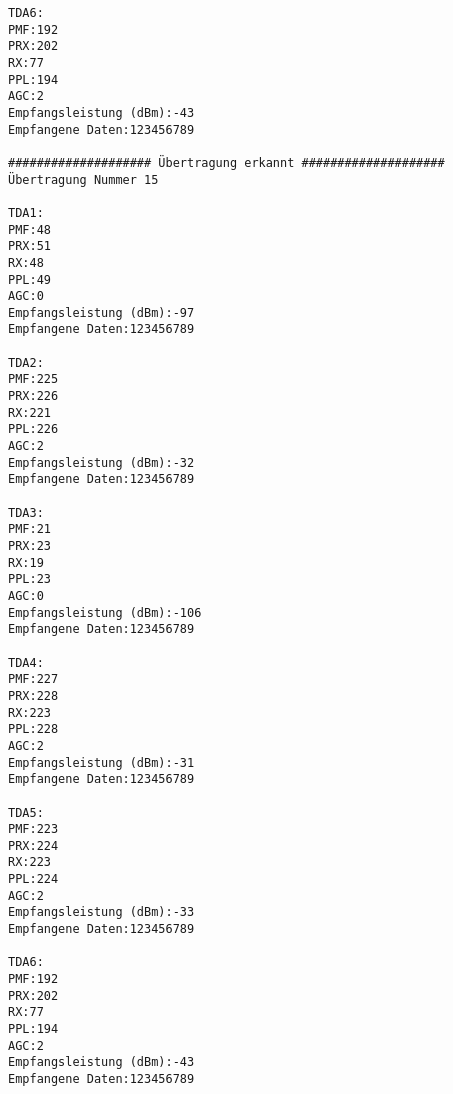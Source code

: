 \begin{lstlisting}[nolol=true,caption={Ausgabe des ersten Feldtests in der Konsole},label={listing:Feldtest1},captionpos=t]
TDA6:
PMF:192
PRX:202
RX:77
PPL:194
AGC:2
Empfangsleistung (dBm):-43
Empfangene Daten:123456789

#################### Übertragung erkannt ####################
Übertragung Nummer 15

TDA1:
PMF:48
PRX:51
RX:48
PPL:49
AGC:0
Empfangsleistung (dBm):-97
Empfangene Daten:123456789

TDA2:
PMF:225
PRX:226
RX:221
PPL:226
AGC:2
Empfangsleistung (dBm):-32
Empfangene Daten:123456789

TDA3:
PMF:21
PRX:23
RX:19
PPL:23
AGC:0
Empfangsleistung (dBm):-106
Empfangene Daten:123456789

TDA4:
PMF:227
PRX:228
RX:223
PPL:228
AGC:2
Empfangsleistung (dBm):-31
Empfangene Daten:123456789

TDA5:
PMF:223
PRX:224
RX:223
PPL:224
AGC:2
Empfangsleistung (dBm):-33
Empfangene Daten:123456789

TDA6:
PMF:192
PRX:202
RX:77
PPL:194
AGC:2
Empfangsleistung (dBm):-43
Empfangene Daten:123456789



\end{lstlisting}



